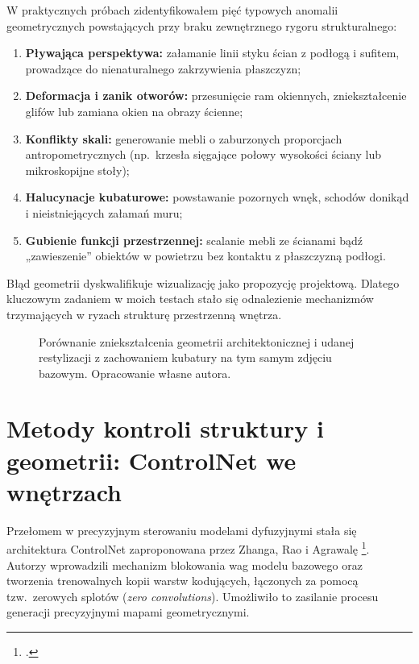 W praktycznych próbach zidentyfikowałem pięć typowych anomalii geometrycznych powstających przy braku zewnętrznego rygoru strukturalnego:
\begin{enumerate}
  \item \textbf{Pływająca perspektywa:} załamanie linii styku ścian z podłogą i sufitem, prowadzące do nienaturalnego zakrzywienia płaszczyzn;
  \item \textbf{Deformacja i zanik otworów:} przesunięcie ram okiennych, zniekształcenie glifów lub zamiana okien na obrazy ścienne;
  \item \textbf{Konflikty skali:} generowanie mebli o zaburzonych proporcjach antropometrycznych (np.\ krzesła sięgające połowy wysokości ściany lub mikroskopijne stoły);
  \item \textbf{Halucynacje kubaturowe:} powstawanie pozornych wnęk, schodów donikąd i nieistniejących załamań muru;
  \item \textbf{Gubienie funkcji przestrzennej:} scalanie mebli ze ścianami bądź „zawieszenie” obiektów w powietrzu bez kontaktu z płaszczyzną podłogi.
\end{enumerate}

Błąd geometrii dyskwalifikuje wizualizację jako propozycję projektową. Dlatego kluczowym zadaniem w moich testach stało się odnalezienie mechanizmów trzymających w ryzach strukturę przestrzenną wnętrza.

\begin{figure}[htbp]
  \centering
  \caption{Porównanie zniekształcenia geometrii architektonicznej i udanej restylizacji z zachowaniem kubatury na tym samym zdjęciu bazowym.
  Opracowanie własne autora.}
  \label{fig:ch04:geometry}
\end{figure}

\section{Metody kontroli struktury i geometrii: ControlNet we wnętrzach}
\label{ch04:sec:controlnet}

Przełomem w precyzyjnym sterowaniu modelami dyfuzyjnymi stała się architektura ControlNet zaproponowana przez Zhanga, Rao i Agrawalę \footcite{zhang2023controlnet}. Autorzy wprowadzili mechanizm blokowania wag modelu bazowego oraz tworzenia trenowalnych kopii warstw kodujących, łączonych za pomocą tzw.\ zerowych splotów (\emph{zero convolutions}). Umożliwiło to zasilanie procesu generacji precyzyjnymi mapami geometrycznymi.

